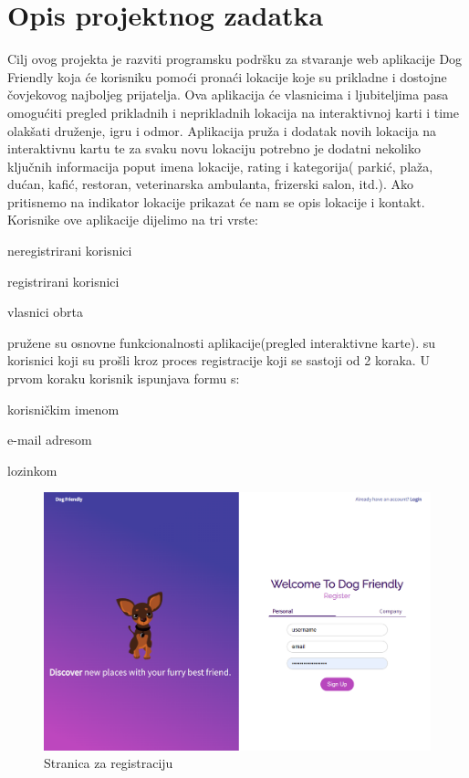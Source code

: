 \chapter{Opis projektnog zadatka}
		
Cilj ovog projekta je razviti programsku podršku za stvaranje web aplikacije Dog Friendly koja će korisniku pomoći pronaći lokacije koje su prikladne i dostojne čovjekovog najboljeg prijatelja. Ova aplikacija  će vlasnicima i ljubiteljima pasa omogućiti pregled prikladnih i neprikladnih lokacija na interaktivnoj karti i time olakšati  druženje, igru i odmor.
Aplikacija  pruža i dodatak novih lokacija na interaktivnu kartu te za svaku novu lokaciju potrebno je dodatni nekoliko ključnih informacija poput imena lokacije, rating i kategorija( parkić, plaža, dućan, kafić, restoran, veterinarska
ambulanta, frizerski salon, itd.). Ako pritisnemo na indikator lokacije prikazat će nam se opis lokacije i kontakt. 
Korisnike ove aplikacije dijelimo na tri vrste:
\begin{packed_item}
	
	\item  neregistrirani korisnici
	\item  registrirani korisnici
	\item  vlasnici obrta
\end{packed_item}
 pružene su osnovne funkcionalnosti aplikacije(pregled interaktivne karte). 
\newline {} su korisnici koji su prošli kroz proces registracije koji se sastoji od 2 koraka. U prvom koraku korisnik ispunjava formu s:
\begin{packed_item}
	
	\item  korisničkim imenom
	\item   e-mail adresom
	\item  lozinkom
\end{packed_item}
\begin{figure}[H]
	\includegraphics[scale=0.4]{slike/RegisterPage.png} 
	\centering
	\caption{Stranica za registraciju}
	\label{fig:promjene}
\end{figure}

